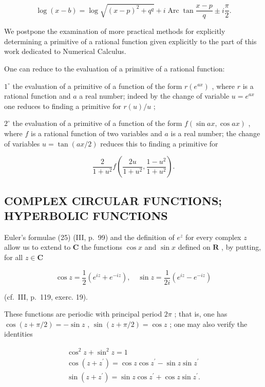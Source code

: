\[
\log (x - b) = \log \sqrt {(x - p) ^ {2} + q ^ {q}} + i \operatorname{Arc} \tan \frac {x - p}{q} \pm i \frac {\pi}{2}.
\]

We postpone the examination of more practical methods for explicitly determining a primitive of a rational function given explicitly to the part of this work dedicated to Numerical Calculus.

One can reduce to the evaluation of a primitive of a rational function:

\(1^{\circ}\) the evaluation of a primitive of a function of the form \(r(e^{ax})\) , where \(r\) is a rational function and \(a\) a real number; indeed by the change of variable \(u = e^{ax}\) one reduces to finding a primitive for \(r(u) / u\) ;

\(2^{\circ}\) the evaluation of a primitive of a function of the form \(f(\sin ax, \cos ax)\) , where \(f\) is a rational function of two variables and \(a\) is a real number; the change of variables \(u = \tan(ax/2)\) reduces this to finding a primitive for

\[
{\frac {2}{1 + u ^ {2}}} f \left({\frac {2 u}{1 + u ^ {2}}}, {\frac {1 - u ^ {2}}{1 + u ^ {2}}}\right).
\]

\subsection{COMPLEX CIRCULAR FUNCTIONS; HYPERBOLIC FUNCTIONS}

Euler's formulae (25) (III, p.~99) and the definition of \(e^z\) for every complex \(z\) allow us to extend to \(\mathbf{C}\) the functions \(\cos x\) and \(\sin x\) defined on \(\mathbf{R}\) , by putting, for all \(z \in \mathbf{C}\)

\[
\cos z = \frac {1}{2} \left(e ^ {i z} + e ^ {- i z}\right), \quad \sin z = \frac {1}{2 i} \left(e ^ {i z} - e ^ {- i z}\right)\tag{32}
\]

(cf.~III, p.~119, exerc. 19).

These functions are periodic with principal period \(2\pi\) ; that is, one has \(\cos(z + \pi/2) = -\sin z\) , \(\sin(z + \pi/2) = \cos z\) ; one may also verify the identities

\[
\begin{array}{c} \cos^ {2} z + \sin^ {2} z = 1 \\ \cos (z + z ^ {\prime}) = \cos z \cos z ^ {\prime} - \sin z \sin z ^ {\prime} \\ \sin (z + z ^ {\prime}) = \sin z \cos z ^ {\prime} + \cos z \sin z ^ {\prime}. \end{array}
\]

